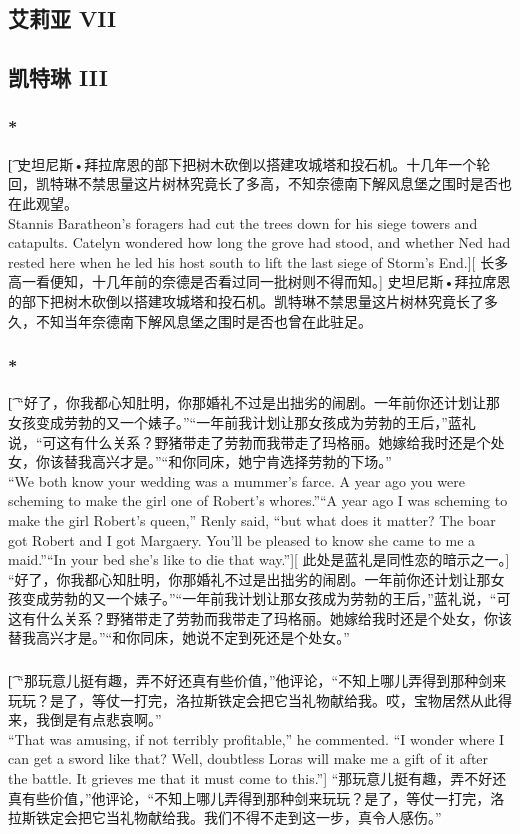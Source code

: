 \documentclass[12pt,a4paper]{article}
\begin{document}
\subsection{艾莉亚 VII}

	
\subsection{凯特琳 III}
\subsubsection{\color{red}*}\t[
	史坦尼斯•拜拉席恩的部下把树木砍倒以搭建攻城塔和投石机。十几年一个轮回，凯特琳不禁思量这片树林究竟长了多高，不知奈德南下解风息堡之围时是否也在此观望。\\
	Stannis Baratheon's foragers had cut the trees down for his siege towers and catapults. Catelyn wondered how long the grove had stood, and whether Ned had rested here when he led his host south to lift the last siege of Storm's End.][
	长多高一看便知，十几年前的奈德是否看过同一批树则不得而知。]
	史坦尼斯•拜拉席恩的部下把树木砍倒以搭建攻城塔和投石机。凯特琳不禁思量这片树林究竟长了多久，不知当年奈德南下解风息堡之围时是否也曾在此驻足。

\subsubsection{\color{red}*}\t[
	 “好了，你我都心知肚明，你那婚礼不过是出拙劣的闹剧。一年前你还计划让那女孩变成劳勃的又一个婊子。”“一年前我计划让那女孩成为劳勃的王后，”蓝礼说，“可这有什么关系？野猪带走了劳勃而我带走了玛格丽。她嫁给我时还是个处女，你该替我高兴才是。”“和你同床，她宁肯选择劳勃的下场。”\\
	 “We both know your wedding was a mummer's farce. A year ago you were scheming to make the girl one of Robert's whores.”“A year ago I was scheming to make the girl Robert's queen,” Renly said, “but what does it matter? The boar got Robert and I got Margaery. You'll be pleased to know she came to me a maid.”“In your bed she's like to die that way.”][
	 此处是蓝礼是同性恋的暗示之一。]
	 “好了，你我都心知肚明，你那婚礼不过是出拙劣的闹剧。一年前你还计划让那女孩变成劳勃的又一个婊子。”“一年前我计划让那女孩成为劳勃的王后，”蓝礼说，“可这有什么关系？野猪带走了劳勃而我带走了玛格丽。她嫁给我时还是个处女，你该替我高兴才是。”“和你同床，她说不定到死还是个处女。”
	 
\subsubsection{}\t[
	 “那玩意儿挺有趣，弄不好还真有些价值，”他评论，“不知上哪儿弄得到那种剑来玩玩？是了，等仗一打完，洛拉斯铁定会把它当礼物献给我。哎，宝物居然从此得来，我倒是有点悲哀啊。”\\
	 “That was amusing, if not terribly profitable,” he commented. “I wonder where I can get a sword like that? Well, doubtless Loras will make me a gift of it after the battle. It grieves me that it must come to this.”]
	 “那玩意儿挺有趣，弄不好还真有些价值，”他评论，“不知上哪儿弄得到那种剑来玩玩？是了，等仗一打完，洛拉斯铁定会把它当礼物献给我。我们不得不走到这一步，真令人感伤。”
	 
\end{document}
